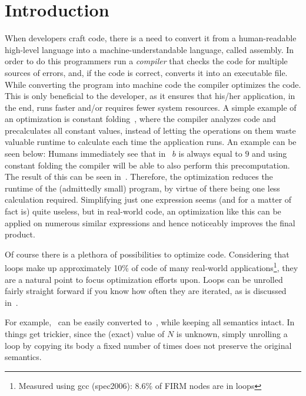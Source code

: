 \chapter{Introduction}\label{sec:intro}



When developers craft code, there is a need to convert it from a human-readable high-level language into a machine-understandable language, called assembly.
In order to do this programmers run a \textit{compiler} that checks the code for multiple sources of errors, and, if the code is correct, converts it into an executable file.
While converting the program into machine code the compiler optimizes the code.
This is only beneficial to the developer, as it ensures that his/her application, in the end, runs faster and/or requires fewer system resources.
A simple example of an optimization is constant folding~\cite{aho_2014}, where the compiler analyzes code and precalculates all constant values, instead of letting the operations on them waste valuable runtime to calculate each time the application runs.
An example can be seen below:
Humans immediately see that in~ $b$ is always equal to $9$ and using constant folding the compiler will be able to also perform this precomputation.
The result of this can be seen in~.
Therefore, the optimization reduces the runtime of the (admittedly small) program, by virtue of there being one less calculation required.
Simplifying just one expression seems (and for a matter of fact is) quite useless, but in real-world code, an optimization like this can be applied on numerous similar expressions and hence noticeably improves the final product.



Of course there is a plethora of possibilities to optimize code.
Considering that loops make up approximately 10\% of code of many real-world applications\footnote{Measured using gcc (spec2006): 8.6\% of FIRM nodes are in loops}, they are a natural point to focus optimization efforts upon.
Loops can be unrolled fairly straight forward if you know how often they are iterated, as is discussed in~.

For example,~ can be easily converted to~, while keeping all semantics intact.
In~ things get trickier, since the (exact) value of $N$ is unknown, simply unrolling a loop by copying its body a fixed number of times does not preserve the original semantics.

